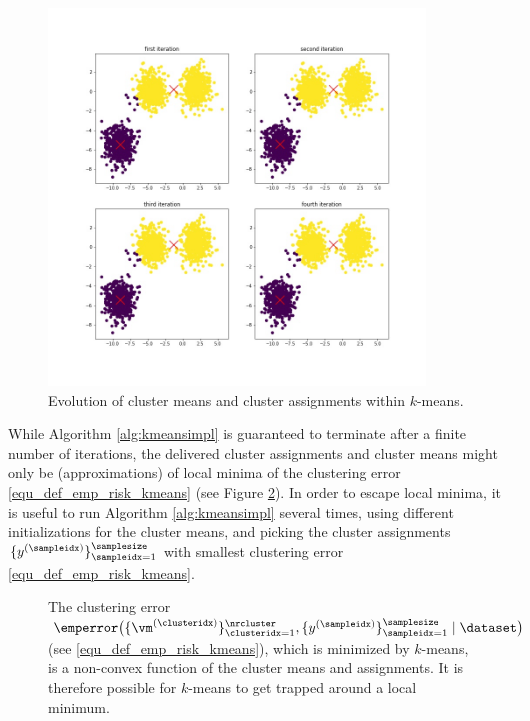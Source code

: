 \documentclass[12pt]{report}
\begin{document}
\begin{figure}[htbp]
\begin{center}
\includegraphics[width=10cm]{EvolKmeans.jpg}  
\vspace*{-6mm}
\end{center}
\caption{Evolution of cluster means and cluster assignments within $k$-means.}
\label{fig:first_iter_kmeans}
\end{figure}

While Algorithm \ref{alg:kmeansimpl} is guaranteed to terminate after a finite number of iterations, the delivered 
cluster assignments and cluster means might only be (approximations) of local minima of the clustering error 
\eqref{equ_def_emp_risk_kmeans} (see Figure \ref{fig_emp_risk_k_means}). In order to escape local minima, 
it is useful to run Algorithm \ref{alg:kmeansimpl} several times, using different initializations for the cluster means, 
and picking the cluster assignments $\{ y^{(\sampleidx)} \}_{\sampleidx=1}^{\samplesize}$ with smallest clustering 
error \eqref{equ_def_emp_risk_kmeans}. 

\begin{figure}[htbp]
\begin{center}
\end{center}
\caption{The clustering error $\emperror \big( \{\vm^{(\clusteridx)}\}_{\clusteridx=1}^{\nrcluster},\{y^{(\sampleidx)}\}_{\sampleidx=1}^{\samplesize} \mid \dataset \big)$ (see \eqref{equ_def_emp_risk_kmeans}), 
which is minimized by $k$-means, is a non-convex function of the cluster means and assignments. 
It is therefore possible for $k$-means to get trapped around a local minimum.} \label{fig_emp_risk_k_means}
\end{figure}
\end{document}
